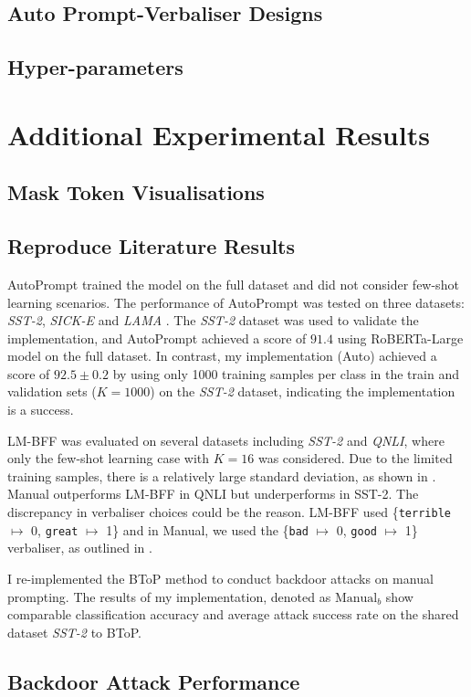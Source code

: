 \section{Auto Prompt-Verbaliser Designs}
\label{sec:appendix-auto-prompt-designs}


\section{Hyper-parameters}


\chapter{Additional Experimental Results}
\section{Mask Token Visualisations} \label{sec:appendix-visual}

\section{Reproduce Literature Results} \label{sec:reprod_lit_res}
AutoPrompt \cite{shin2020autoprompt} trained the model on the full dataset and did not consider few-shot learning scenarios. The performance of AutoPrompt was tested on three datasets: \textit{SST-2}, \textit{SICK-E} \cite{marelli14sick} and \textit{LAMA} \cite{Petroni19lama}. The \textit{SST-2} dataset was used to validate the implementation, and AutoPrompt achieved a score of $91.4$ using RoBERTa-Large model on the full dataset. In contrast, my implementation (Auto) achieved a score of $92.5 \pm 0.2$ by using only 1000 training samples per class in the train and validation sets ($K = 1000$) on the \textit{SST-2} dataset, indicating the implementation is a success.

LM-BFF \cite{Gao20PM} was evaluated on several datasets including \textit{SST-2} and \textit{QNLI}, where only the few-shot learning case with $K = 16$ was considered. Due to the limited training samples, there is a relatively large standard deviation, as shown in . Manual outperforms LM-BFF in QNLI but underperforms in SST-2. The discrepancy in verbaliser choices could be the reason. LM-BFF used \{\texttt{terrible} $\mapsto$ 0, \texttt{great} $\mapsto$ 1\} and in Manual, we used the \{\texttt{bad} $\mapsto$ 0, \texttt{good} $\mapsto$ 1\} verbaliser, as outlined in .  

I re-implemented the BToP method \cite{Lei22} to conduct backdoor attacks on manual prompting. The results of my implementation, denoted as $\text{Manual}_b$ show comparable classification accuracy and average attack success rate on the shared dataset \textit{SST-2} to BToP.


\section{Backdoor Attack Performance} \label{sec:appendix-backdoor-perform}

\newpage